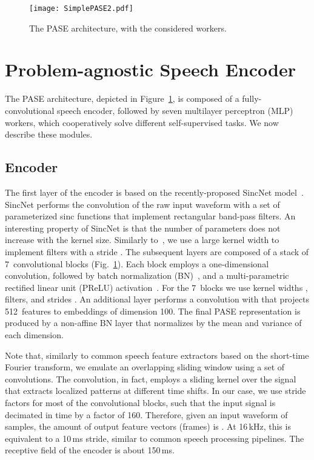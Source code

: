 \documentclass[a4paper]{article}
\begin{document}
\begin{figure}[t]
    \centering
    \texttt{[image: SimplePASE2.pdf]}
\caption{The PASE architecture, with the considered workers. }
    \label{fig:PASE}
\end{figure}




\section{Problem-agnostic Speech Encoder}
The PASE architecture, depicted in Figure~\ref{fig:PASE}, is composed of a fully-convolutional speech encoder, followed by seven multilayer perceptron (MLP) workers, which cooperatively solve different self-supervised tasks. We now describe these modules.


\subsection{Encoder}
\label{sec:architecture}


The first layer of the encoder is based on the recently-proposed SincNet model~\cite{ravanelli2018speaker}. SincNet performs the convolution of the raw input waveform with a set of parameterized sinc functions that implement rectangular band-pass filters. An interesting property of SincNet is that the number of parameters does not increase with the kernel size. Similarly to~\cite{ravanelli2018speaker,sincnet_irasl}, we use a large kernel width  to implement  filters with a stride . 
The subsequent layers are composed of a stack of 7~convolutional blocks (Fig.~\ref{fig:PASE}). Each block employs a one-dimensional convolution, followed by batch normalization (BN)~\cite{batchnorm}, and a multi-parametric rectified linear unit (PReLU) activation~\cite{he2015delving}. For the 7~blocks we use kernel widths ,  filters, and strides . An additional layer performs a convolution with  that projects 512~features to embeddings of dimension 100. The final PASE representation is produced by a non-affine BN layer that normalizes by the mean and variance of each dimension.

Note that, similarly to common speech feature extractors based on the short-time Fourier transform, we emulate an overlapping sliding window using a set of convolutions. The convolution, in fact, 
employs a sliding kernel over the signal that extracts localized patterns at different time shifts. 
In our case, we use stride factors  for most of the convolutional blocks, such that the input signal is decimated in time by a factor of 160. Therefore, given an input waveform of  samples, the amount of output feature vectors (frames) is . At 16\,kHz, this is equivalent to a 10\,ms stride, similar to common speech processing pipelines. The receptive field of the encoder is about 150\,ms. 
\end{document}
